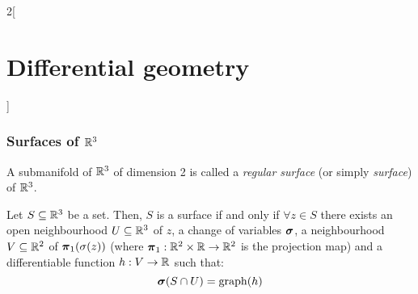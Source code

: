 \documentclass[../../../main.tex]{subfiles}
\begin{document}
\begin{multicols}{2}[\section{Differential geometry}]
  \subsubsection{Surfaces of \texorpdfstring{$\mathbb{R}^3$}{R3}}
  \begin{definition}
    A submanifold of $\mathbb{R}^3$ of dimension 2 is called a \emph{regular surface} (or simply \emph{surface}) of $\mathbb{R}^3$.
  \end{definition}
  \begin{proposition}
    Let $S\subseteq\mathbb{R}^3$ be a set. Then, $S$ is a surface if and only if $\forall z\in S$ there exists an open neighbourhood $U\subseteq \mathbb{R}^3$ of $z$, a change of variables $\boldsymbol{\mathrm{\sigma}}$, a neighbourhood $V\subseteq \mathbb{R}^2$ of $\boldsymbol{\mathrm{\pi}}_1(\sigma(z))$ (where $\boldsymbol{\mathrm{\pi}}_1:\mathbb{R}^2\times \mathbb{R}\rightarrow\mathbb{R}^2$ is the projection map) and a differentiable function $h:V\rightarrow \mathbb{R}$ such that: $$\boldsymbol{\mathrm{\sigma}}(S\cap U)=\operatorname{graph}(h)$$
  \end{proposition}

\end{multicols}
\end{document}
